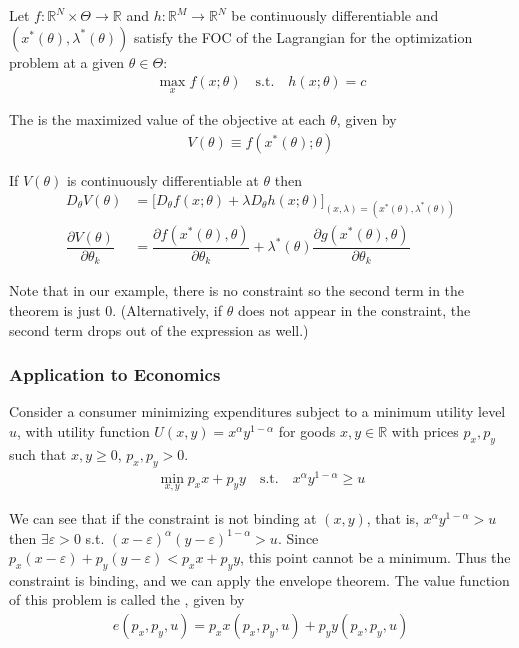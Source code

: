 \documentclass{article}
\begin{document}
\begin{theorem}
  Let $f: \mathbb{R}^N \times \Theta \to \mathbb{R}$ and $h: \mathbb{R}^M \to \mathbb{R}^N$ be continuously differentiable and $(x^*(\theta), \lambda^*(\theta))$ satisfy the FOC of the Lagrangian for the optimization problem at a given $\theta \in \Theta$:
  \begin{align*}
    \max_x f(x; \theta) \quad\text{s.t.}\quad h(x; \theta) = c
  \end{align*}

  The  is the maximized value of the objective at each $\theta$, given by
  \begin{align*}
    V(\theta) \equiv f(x^*(\theta); \theta)
  \end{align*}

  If $V(\theta)$ is continuously differentiable at $\theta$ then
  \begin{align*}
    D_{\theta} V(\theta)
    &
    =
    \Big[
      D_{\theta} f(x; \theta)
      +
      \lambda
      D_{\theta} h(x; \theta)
    \Big]_{(x, \lambda) = (x^*(\theta), \lambda^*(\theta))}
    \\
    \dfrac{\partial V(\theta)}{\partial \theta_k}
    &
    =
    \dfrac{\partial f(x^*(\theta), \theta)}{\partial \theta_k}
    +
    \lambda^*(\theta) \dfrac{\partial g(x^*(\theta), \theta)}{\partial \theta_k}
  \end{align*}
\end{theorem}

Note that in our example, there is no constraint so the second term in the theorem is just $0$. (Alternatively, if $\theta$ does not appear in the constraint, the second term drops out of the expression as well.)

\subsubsection{Application to Economics}
\label{ssub:application_to_economics}

Consider a consumer minimizing expenditures subject to a minimum utility level $u$, with utility function $U(x, y) = x^\alpha y^{1 - \alpha}$ for goods $x, y \in \mathbb{R}$ with prices $p_x, p_y$ such that $x, y \ge 0$, $p_x, p_y > 0$.
\begin{align*}
  \min_{x, y} p_x x + p_y y
  \quad\text{s.t.}\quad
  x^{\alpha} y^{1 - \alpha} \ge u
\end{align*}

We can see that if the constraint is not binding at $(x, y)$, that is, $x^{\alpha} y^{1 - \alpha} > u$ then $\exists \varepsilon > 0$ s.t.  $(x- \varepsilon)^{\alpha} (y - \varepsilon)^{1 - \alpha} > u$. Since $p_x (x - \varepsilon) + p_y(y - \varepsilon) < p_x x + p_y y$, this point cannot be a minimum. Thus the constraint is binding, and we can apply the envelope theorem. The value function of this problem is called the , given by
\begin{align*}
  e(p_x, p_y, u) = p_x x(p_x, p_y, u) + p_y y(p_x, p_y, u)
\end{align*}
\end{document}
